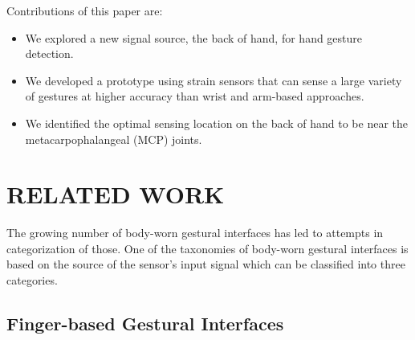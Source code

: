 \documentclass{sigchi}
\begin{document}
Contributions of this paper are:
\begin{itemize}
\item We explored a new signal source, the back of hand, for hand gesture detection.
\item We developed a prototype using strain sensors that can sense a large variety of gestures at higher accuracy than wrist and arm-based approaches. 
\item We identified the optimal sensing location on the back of hand to be near the metacarpophalangeal (MCP) joints.
\end{itemize}


\section{RELATED WORK}

The growing number of body-worn gestural interfaces has led to attempts in categorization of those.
One of the taxonomies of body-worn gestural interfaces is based on the source of the sensor's input signal which can be classified into three categories.

\subsection{Finger-based Gestural Interfaces}

\end{document}
